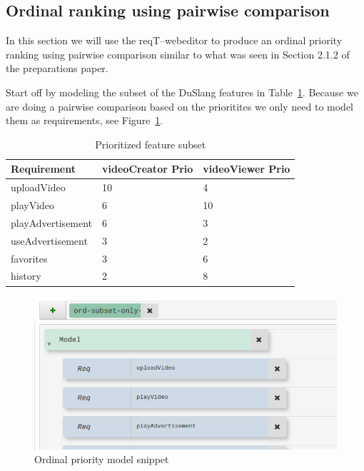 \documentclass[11pt]{article}
\begin{document}
%
%
\subsection{Ordinal ranking using pairwise comparison}
In this section we will use the reqT--webeditor to produce an ordinal priority ranking using pairwise comparison similar to what was seen in Section 2.1.2 of the preparations paper.


Start off by modeling the subset of the DuSlang features in Table~\ref{table:prio-table-duslang}. Because we are doing a pairwise comparison based on the prioritites we only need to model them as requirements, see Figure~\ref{fig:model-form}.

\begin{table}[h]
\centering
\begin{tabular}{|l|l|l|}
\hline
\textbf{Requirement}    & \textbf{videoCreator Prio} & \textbf{videoViewer Prio}\\ \hline
uploadVideo         & 10                         & 4                        \\ \hline
playVideo           & 6                          & 10                       \\ \hline
playAdvertisement   & 6                          & 3                        \\ \hline
useAdvertisement    & 3                          & 2                        \\ \hline
favorites           & 3                          & 6                        \\ \hline
history             & 2                          & 8                        \\ \hline
\end{tabular}
\caption{Prioritized feature subset}
\label{table:prio-table-duslang}
\end{table}

\begin{figure}[ht]
    \centering
    \includegraphics[width=\textwidth]{model-form-cut.png}
    \caption{Ordinal priority model snippet}
    \label{fig:model-form}
\end{figure}
\end{document}
